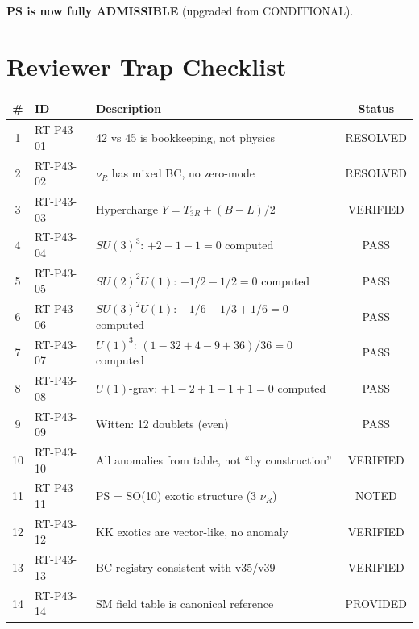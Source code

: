 \documentclass[11pt,a4paper]{article}
\begin{document}
\textbf{PS is now fully ADMISSIBLE} (upgraded from CONDITIONAL).

\appendix

\section{Reviewer Trap Checklist}
\label{app:traps}

\begin{longtable}{clp{8cm}c}
\toprule
\# & ID & Description & Status \\
\midrule
\endhead
1 & RT-P43-01 & 42 vs 45 is bookkeeping, not physics & \textcolor{green!60!black}{RESOLVED} \\
2 & RT-P43-02 & $\nu_R$ has mixed BC, no zero-mode & \textcolor{green!60!black}{RESOLVED} \\
3 & RT-P43-03 & Hypercharge $Y = T_{3R} + (B-L)/2$ & \textcolor{green!60!black}{VERIFIED} \\
4 & RT-P43-04 & $SU(3)^3$: $+2-1-1 = 0$ computed & \textcolor{green!60!black}{PASS} \\
5 & RT-P43-05 & $SU(2)^2 U(1)$: $+1/2-1/2 = 0$ computed & \textcolor{green!60!black}{PASS} \\
6 & RT-P43-06 & $SU(3)^2 U(1)$: $+1/6-1/3+1/6 = 0$ computed & \textcolor{green!60!black}{PASS} \\
7 & RT-P43-07 & $U(1)^3$: $(1-32+4-9+36)/36 = 0$ computed & \textcolor{green!60!black}{PASS} \\
8 & RT-P43-08 & $U(1)$-grav: $+1-2+1-1+1 = 0$ computed & \textcolor{green!60!black}{PASS} \\
9 & RT-P43-09 & Witten: 12 doublets (even) & \textcolor{green!60!black}{PASS} \\
10 & RT-P43-10 & All anomalies from table, not ``by construction'' & \textcolor{green!60!black}{VERIFIED} \\
11 & RT-P43-11 & PS = SO(10) exotic structure (3 $\nu_R$) & \textcolor{green!60!black}{NOTED} \\
12 & RT-P43-12 & KK exotics are vector-like, no anomaly & \textcolor{green!60!black}{VERIFIED} \\
13 & RT-P43-13 & BC registry consistent with v35/v39 & \textcolor{green!60!black}{VERIFIED} \\
14 & RT-P43-14 & SM field table is canonical reference & \textcolor{green!60!black}{PROVIDED} \\

\end{longtable}
\end{document}
